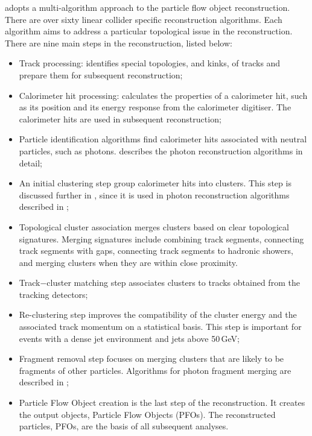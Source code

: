 
\pandora adopts a multi-algorithm approach to the particle flow object reconstruction. There are over sixty \ee linear collider specific reconstruction algorithms. Each algorithm aims to address a particular topological issue in the reconstruction. There are nine main steps in the \pandora reconstruction, listed below:
\begin{itemize}
  \item Track processing:  identifies special topologies,  and kinks, of tracks and prepare them for subsequent reconstruction;
  \item Calorimeter hit processing: calculates the properties of a calorimeter hit, such  as its position and its energy response from the calorimeter digitiser. The calorimeter hits are used in subsequent reconstruction;
  \item Particle identification algorithms find calorimeter hits associated with neutral particles, such as photons.  describes the photon reconstruction  algorithms in detail;
  \item An initial clustering step group calorimeter hits into clusters. This step is discussed further in , since it is used in photon reconstruction  algorithms described in ;
  \item Topological cluster association merges clusters based on clear topological signatures. Merging signatures include combining track segments, connecting track segments with gaps, connecting track segments to hadronic showers, and merging clusters when they are within close proximity.
  \item Track$-$cluster  matching step associates clusters to tracks obtained from the tracking detectors;
  \item Re-clustering step  improves the compatibility of the cluster energy and the associated track momentum on a statistical basis. This step is important for events with a dense jet environment and jets above 50\,GeV;
  \item Fragment removal step  focuses on merging clusters that are likely to be fragments of other particles. Algorithms for photon fragment merging  are described in ;
  \item Particle Flow Object creation is the last step of the \pandora reconstruction. It creates the output objects, Particle Flow Objects (PFOs). The reconstructed particles, PFOs, are the basis of all subsequent analyses.

\end{itemize}

